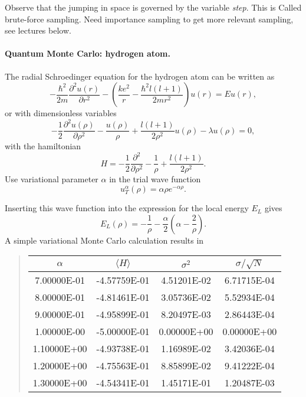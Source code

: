\documentclass[%
oneside,                 %
final,                   %
10pt]{article}
\begin{document}
\noindent
Observe that the jumping in space is governed by the variable \emph{step}. This is Called brute-force sampling.
Need importance sampling to get more relevant sampling, see lectures below.

\paragraph{Quantum Monte Carlo: hydrogen atom.}
The radial Schroedinger equation for the hydrogen atom can be
written as
\[
-\frac{\hbar^2}{2m}\frac{\partial^2 u(r)}{\partial r^2}-
\left(\frac{ke^2}{r}-\frac{\hbar^2l(l+1)}{2mr^2}\right)u(r)=Eu(r),
\]
or with dimensionless variables
\[
-\frac{1}{2}\frac{\partial^2 u(\rho)}{\partial \rho^2}-
\frac{u(\rho)}{\rho}+\frac{l(l+1)}{2\rho^2}u(\rho)-\lambda u(\rho)=0,
\label{eq:hydrodimless1}
\]
with the hamiltonian
\[
H=-\frac{1}{2}\frac{\partial^2 }{\partial \rho^2}-
\frac{1}{\rho}+\frac{l(l+1)}{2\rho^2}.
\]
Use variational parameter $\alpha$ in the trial
wave function 
\[
   u_T^{\alpha}(\rho)=\alpha\rho e^{-\alpha\rho}. 
   \label{eq:trialhydrogen}
\]

Inserting this wave function into the expression for the
local energy $E_L$ gives
\[
   E_L(\rho)=-\frac{1}{\rho}-
              \frac{\alpha}{2}\left(\alpha-\frac{2}{\rho}\right).
\]
A simple variational Monte Carlo calculation results in

\begin{quote}
\begin{tabular}{cccc}
\hline
\multicolumn{1}{c}{ $\alpha$ } & \multicolumn{1}{c}{ $\langle H \rangle $ } & \multicolumn{1}{c}{ $\sigma^2$ } & \multicolumn{1}{c}{ $\sigma/\sqrt{N}$ } \\
\hline
7.00000E-01 & -4.57759E-01         & 4.51201E-02 & 6.71715E-04       \\
8.00000E-01 & -4.81461E-01         & 3.05736E-02 & 5.52934E-04       \\
9.00000E-01 & -4.95899E-01         & 8.20497E-03 & 2.86443E-04       \\
1.00000E-00 & -5.00000E-01         & 0.00000E+00 & 0.00000E+00       \\
1.10000E+00 & -4.93738E-01         & 1.16989E-02 & 3.42036E-04       \\
1.20000E+00 & -4.75563E-01         & 8.85899E-02 & 9.41222E-04       \\
1.30000E+00 & -4.54341E-01         & 1.45171E-01 & 1.20487E-03       \\
\hline
\end{tabular}
\end{quote}
\end{document}
